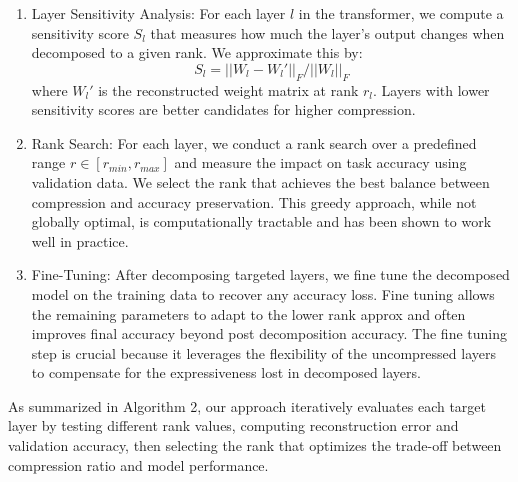 \documentclass[conference]{IEEEtran}
\begin{document}
\begin{enumerate}
    \item Layer Sensitivity Analysis:
    For each layer $l$ in the transformer, we compute a sensitivity score $S_l$ that measures how much the layer's output changes
    when decomposed to a given rank. We approximate this by:
    \[
    S_l = ||W_l - W_l'||_F/||W_l||_F
    \]
    where $W_l'$ is the reconstructed weight matrix at rank $r_l$. Layers with lower sensitivity scores are better candidates
    for higher compression.

    \item Rank Search:
    For each layer, we conduct a rank search over a predefined range $r \in [r_{min}, r_{max}]$ and measure the impact on task
    accuracy using validation data. We select the rank that achieves the best balance between compression and accuracy preservation.
    This greedy approach, while not globally optimal, is computationally tractable and has been shown to work well in practice.

    \item Fine-Tuning:
    After decomposing targeted layers, we fine tune the decomposed model on the training data to recover any accuracy loss.
    Fine tuning allows the remaining parameters to adapt to the lower rank approx and often improves final accuracy beyond 
    post decomposition accuracy. The fine tuning step is crucial because it leverages the flexibility of the uncompressed layers
    to compensate for the expressiveness lost in decomposed layers.
\end{enumerate}

As summarized in Algorithm 2, our approach iteratively evaluates each target layer by testing different rank values, computing reconstruction error and validation accuracy, then selecting the rank that optimizes the trade-off between compression ratio and model performance.
\end{document}
